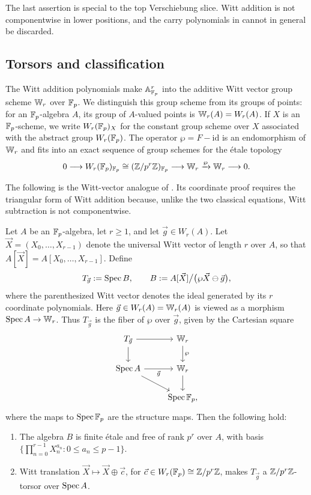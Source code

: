 The last assertion is special to the top Verschiebung slice. Witt addition is
not componentwise in lower positions, and the carry polynomials in
 cannot in general be discarded.

\subsection{Torsors and classification}
The Witt addition polynomials make $\mathbb{A}^r_{\mathbb{F}_p}$ into the additive Witt
vector group scheme $\mathbb{W}_r$ over $\mathbb{F}_p$. We distinguish this group scheme from its
groups of points: for an $\mathbb{F}_p$-algebra $A$, its group of $A$-valued points
is $\mathbb{W}_r(A)=W_r(A)$. If $X$ is an $\mathbb{F}_p$-scheme, we write
$W_r(\mathbb{F}_p)_X$ for the constant group scheme over $X$ associated with the
abstract group $W_r(\mathbb{F}_p)$. The operator $\wp=F-\mathrm{id}$ is an
endomorphism of $\mathbb{W}_r$ and fits into an exact sequence of group schemes for
the \'etale topology
\begin{equation}\label{eq:asw_lang_sequence}
0\longrightarrow W_r(\mathbb{F}_p)_{\mathbb{F}_p}\cong(\mathbb{Z}/p^r\mathbb{Z})_{\mathbb{F}_p}
\longrightarrow\mathbb{W}_r\xrightarrow{\wp}\mathbb{W}_r\longrightarrow0.
\end{equation}

The following is the Witt-vector analogue of
. Its coordinate proof
requires the triangular form of Witt addition because, unlike the two
classical equations, Witt subtraction is not componentwise.

\begin{lemma}
\label{lemma:asw_etale_torsor}
Let $A$ be an $\mathbb{F}_p$-algebra, let $r\geq1$, and let $\vec g\in W_r(A)$. Let
$\vec X=(X_0,\dots,X_{r-1})$ denote the universal Witt vector of length $r$
over $A$, so that $A[\vec X]=A[X_0,\dots,X_{r-1}]$. Define
\[
T_{\vec g}:=\operatorname{Spec} B,
\qquad
B:=A[\vec X]\big/\bigl(\wp\vec X\ominus\vec g\bigr),
\]
where the parenthesized Witt vector denotes the ideal generated by its $r$
coordinate polynomials.
Here $\vec g\in W_r(A)=\mathbb{W}_r(A)$ is viewed as a morphism
$\operatorname{Spec} A\to\mathbb{W}_r$. Thus $T_{\vec g}$ is the fiber of $\wp$ over
$\vec g$, given by the Cartesian square
\[
\begin{tikzcd}
T_{\vec g} \arrow[r] \arrow[d] & \bW_r \arrow[d,"\wp"] \\
\Spec A \arrow[r,"\vec g"'] \arrow[dr] & \bW_r \arrow[d] \\
& \Spec\F_p,
\end{tikzcd}
\]
where the maps to $\operatorname{Spec}\mathbb{F}_p$ are the structure maps.
Then the following hold:
\begin{enumerate}[label=(\roman*)]
\item The algebra $B$ is finite \'etale and free of rank $p^r$ over $A$,
with basis
$\{\prod_{n=0}^{r-1}X_n^{a_n}:0\leq a_n\leq p-1\}$.
\item Witt translation $\vec X\mapsto\vec X\oplus\vec c$, for
$\vec c\in W_r(\mathbb{F}_p)\cong\mathbb{Z}/p^r\mathbb{Z}$, makes $T_{\vec g}$ a
$\mathbb{Z}/p^r\mathbb{Z}$-torsor over $\operatorname{Spec} A$.
\end{enumerate}
\end{lemma}

